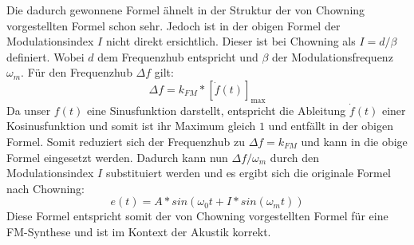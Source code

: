 Die dadurch gewonnene Formel ähnelt in der Struktur der von Chowning vorgestellten Formel schon sehr. Jedoch ist in der obigen Formel der Modulationsindex $I$ nicht direkt ersichtlich. Dieser ist bei Chowning als $I=d/\beta$ definiert. Wobei $d$ dem Frequenzhub entspricht und $\beta$ der Modulationsfrequenz $\omega_m$. Für den Frequenzhub $\Delta f$ gilt: \cite[S. 219]{lathi}
\begin{equation*}
\Delta f = k_{FM}*[\dot f(t)]_{\max}
\end{equation*}
Da unser $f(t)$ eine Sinusfunktion darstellt, entspricht die Ableitung $\dot f(t)$ einer Kosinusfunktion und somit ist ihr Maximum gleich $1$ und entfällt in der obigen Formel. Somit reduziert sich der Frequenzhub zu $\Delta f=k_{FM}$ und kann in die obige Formel eingesetzt werden. Dadurch kann nun $\Delta f / \omega_m$ durch den Modulationsindex $I$ substituiert werden und es ergibt sich die originale Formel nach Chowning:
\begin{equation}
e(t)=A*sin(\omega_0t+I*sin(\omega_m t))
\label{eq:FM_Chowning}
\end{equation}
Diese Formel entspricht somit der von Chowning vorgestellten Formel für eine FM-Synthese und ist im Kontext der Akustik korrekt.



\FloatBarrier
